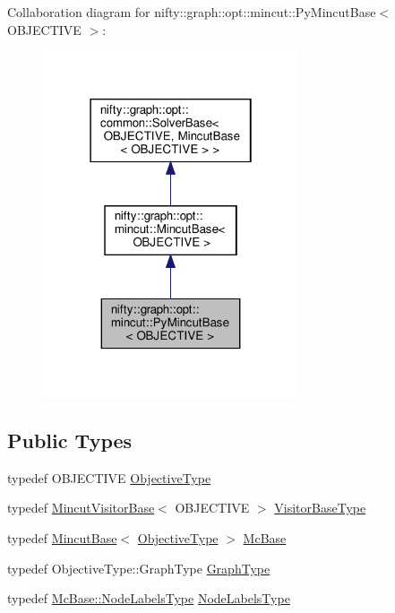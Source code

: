 Collaboration diagram for nifty\+:\+:graph\+:\+:opt\+:\+:mincut\+:\+:Py\+Mincut\+Base$<$ O\+B\+J\+E\+C\+T\+I\+VE $>$\+:
\nopagebreak
\begin{figure}[H]
\begin{center}
\leavevmode
\includegraphics[width=214pt]{classnifty_1_1graph_1_1opt_1_1mincut_1_1PyMincutBase__coll__graph}
\end{center}
\end{figure}
\subsection*{Public Types}
\begin{DoxyCompactItemize}
\item 
typedef O\+B\+J\+E\+C\+T\+I\+VE \hyperlink{classnifty_1_1graph_1_1opt_1_1mincut_1_1PyMincutBase_ad5ee76481f2aeb8544717a69b2760a6b}{Objective\+Type}
\item 
typedef \hyperlink{namespacenifty_1_1graph_1_1opt_1_1mincut_af5f9546254de453f964641e936ad8ba3}{Mincut\+Visitor\+Base}$<$ O\+B\+J\+E\+C\+T\+I\+VE $>$ \hyperlink{classnifty_1_1graph_1_1opt_1_1mincut_1_1PyMincutBase_ab39a6b86f6807f6d1cc2325567bfff6f}{Visitor\+Base\+Type}
\item 
typedef \hyperlink{classnifty_1_1graph_1_1opt_1_1mincut_1_1MincutBase}{Mincut\+Base}$<$ \hyperlink{classnifty_1_1graph_1_1opt_1_1mincut_1_1PyMincutBase_ad5ee76481f2aeb8544717a69b2760a6b}{Objective\+Type} $>$ \hyperlink{classnifty_1_1graph_1_1opt_1_1mincut_1_1PyMincutBase_a2d5ad5e3ada1a7a4264ad3a20575a5a7}{Mc\+Base}
\item 
typedef Objective\+Type\+::\+Graph\+Type \hyperlink{classnifty_1_1graph_1_1opt_1_1mincut_1_1PyMincutBase_a8af93d1298541076bf3ca413fd200979}{Graph\+Type}
\item 
typedef \hyperlink{classnifty_1_1graph_1_1opt_1_1common_1_1SolverBase_abefd51561de2fd009f6bed6bef6009ea}{Mc\+Base\+::\+Node\+Labels\+Type} \hyperlink{classnifty_1_1graph_1_1opt_1_1mincut_1_1PyMincutBase_a54c8146f750e7085a430228c3082a0cf}{Node\+Labels\+Type}
\end{DoxyCompactItemize}
